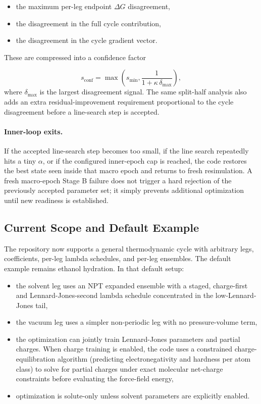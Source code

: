 \begin{itemize}
    \item the maximum per-leg endpoint $\Delta G$ disagreement,
    \item the disagreement in the full cycle contribution,
    \item the disagreement in the cycle gradient vector.
\end{itemize}

These are compressed into a confidence factor

\begin{equation}
    s_{\mathrm{conf}}
    =
    \max
    \left(
        s_{\min},
        \frac{1}{1 + \kappa \, \delta_{\max}}
    \right),
\end{equation}
%
where $\delta_{\max}$ is the largest disagreement signal. The same split-half analysis also adds an extra residual-improvement requirement proportional to the cycle disagreement before a line-search step is accepted.

\paragraph{Inner-loop exits.}

If the accepted line-search step becomes too small, if the line search repeatedly hits a tiny $\alpha$, or if the configured inner-epoch cap is reached, the code restores the best state seen inside that macro epoch and returns to fresh resimulation. A fresh macro-epoch Stage B failure does not trigger a hard rejection of the previously accepted parameter set; it simply prevents additional optimization until new readiness is established.

\subsection{Current Scope and Default Example}

The repository now supports a general thermodynamic cycle with arbitrary legs, coefficients, per-leg lambda schedules, and per-leg ensembles. The default example remains ethanol hydration. In that default setup:

\begin{itemize}
    \item the solvent leg uses an NPT expanded ensemble with a staged, charge-first and Lennard-Jones-second lambda schedule concentrated in the low-Lennard-Jones tail,
    \item the vacuum leg uses a simpler non-periodic leg with no pressure-volume term,
    \item the optimization can jointly train Lennard-Jones parameters and partial charges. When charge training is enabled, the code uses a constrained charge-equilibration algorithm (predicting electronegativity and hardness per atom class) to solve for partial charges under exact molecular net-charge constraints before evaluating the force-field energy,
    \item optimization is solute-only unless solvent parameters are explicitly enabled.
\end{itemize}

